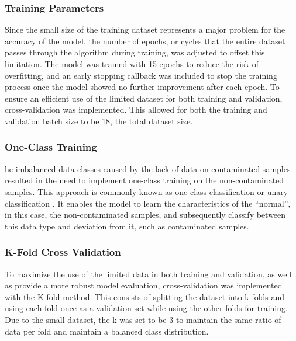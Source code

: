 \documentclass[final, 3p, 11pt]{elsarticle}
\begin{document}
\subsubsection{Training Parameters}
Since the small size of the training dataset represents a major problem for the accuracy of the model, the number of epochs, or cycles that the entire dataset passes through the algorithm during training, was adjusted to offset this limitation. The model was trained with 15 epochs to reduce the risk of overfitting, and an early stopping callback was included to stop the training process once the model showed no further improvement after each epoch. To ensure an efficient use of the limited dataset for both training and validation, cross-validation was implemented. This allowed for both the training and validation batch size to be 18, the total dataset size.

\subsubsection{One-Class Training}
he imbalanced data classes caused by the lack of data on contaminated samples resulted in the need to implement one-class training on the non-contaminated samples. This approach is commonly known as one-class classification or unary classification \citep{brownlee_2020_oneclass}. It enables the model to learn the characteristics of the “normal”, in this case, the non-contaminated samples, and subsequently classify between this data type and deviation from it, such as contaminated samples.

\subsubsection{K-Fold Cross Validation}
To maximize the use of the limited data in both training and validation, as well as provide a more robust model evaluation, cross-validation was implemented with the K-fold method. This consists of splitting the dataset into k folds and using each fold once as a validation set while using the other folds for training. Due to the small dataset, the k was set to be 3 to maintain the same ratio of data per fold and maintain a balanced class distribution.
\end{document}
